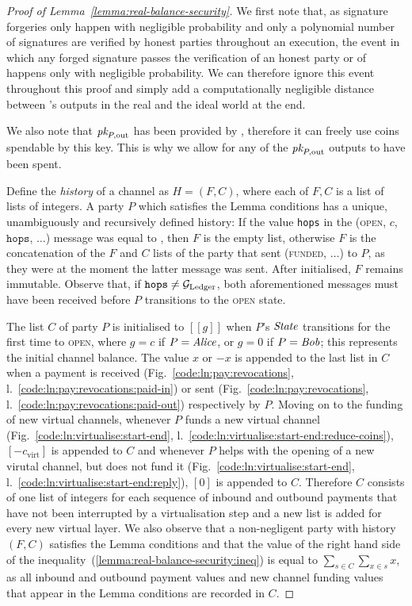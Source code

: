 \begin{proof}[Proof of Lemma~\ref{lemma:real-balance-security}]
  We first note that, as signature forgeries only happen with negligible
  probability and only a polynomial number of signatures are verified by honest
  parties throughout an execution, the event in which any forged signature
  passes the verification of an honest party or of \ledger happens only with
  negligible probability. We can therefore ignore this event throughout this
  proof and simply add a computationally negligible distance between
  \environment's outputs in the real and the ideal world at the end.

  We also note that $\textit{pk}_{P, \mathrm{out}}$ has been provided by \environment,
  therefore it can freely use coins spendable by this key. This is why we allow
  for any of the $\textit{pk}_{P, \mathrm{out}}$ outputs to have been spent.

  Define the \emph{history} of a channel as $H = (F, C)$, where each of $F, C$
  is a list of lists of integers. A party $P$ which satisfies the Lemma
  conditions has a unique, unambiguously and recursively defined history: If the
  value \texttt{hops} in the (\textsc{open}, $c$, $\texttt{hops}$, $\dots$)
  message was equal to \ledger, then $F$ is the empty list, otherwise $F$ is the
  concatenation of the $F$ and $C$ lists of the party that sent
  (\textsc{funded}, $\dots$) to $P$, as they were at the moment the latter
  message was sent. After initialised, $F$ remains immutable. Observe that, if
  $\texttt{hops} \neq \mathcal{G}_{\mathrm{Ledger}}$, both aforementioned messages must have been
  received before $P$ transitions to the \textsc{open} state.

  The list $C$ of party $P$ is initialised to $[[g]]$ when $P$'s $\itistate$
  transitions for the first time to \textsc{open}, where $g = c$ if $P =
  \mathit{Alice}$, or $g = 0$ if $P = \mathit{Bob}$; this represents the initial channel
  balance. The value $x$ or $-x$ is appended to the last list in $C$ when a
  payment is received (Fig.~\ref{code:ln:pay:revocations},
  l.~\ref{code:ln:pay:revocations:paid-in}) or sent
  (Fig.~\ref{code:ln:pay:revocations},
  l.~\ref{code:ln:pay:revocations:paid-out}) respectively by $P$. Moving on to
  the funding of new virtual channels, whenever $P$ funds a new virtual channel
  (Fig.~\ref{code:ln:virtualise:start-end},
  l.~\ref{code:ln:virtualise:start-end:reduce-coins}), $[-c_{\mathrm{virt}}]$
  is appended to $C$ and whenever $P$ helps with the opening of a new virutal
  channel, but does not fund it (Fig.~\ref{code:ln:virtualise:start-end},
  l.~\ref{code:ln:virtualise:start-end:reply}), $[0]$ is appended to $C$.
  Therefore $C$ consists of one list of integers for each sequence of inbound
  and outbound payments that have not been interrupted by a virtualisation step
  and a new list is added for every new virtual layer. We also observe that a
  non-negligent party with history $(F, C)$ satisfies the Lemma conditions and
  that the value of the right hand side of the
  inequality~(\ref{lemma:real-balance-security:ineq}) is equal to
  $\sum\limits_{s \in C} \sum\limits_{x \in s} x$, as all inbound and outbound
  payment values and new channel funding values that appear in the Lemma
  conditions are recorded in $C$.


\end{proof}
